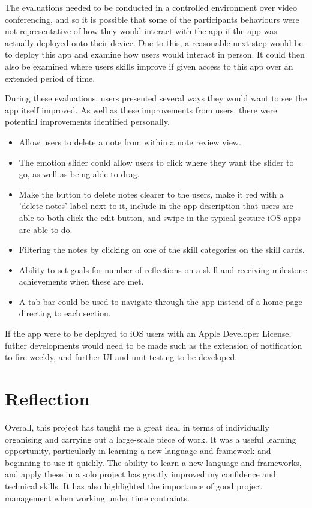 \documentclass{l4proj}
\begin{document}
The evaluations needed to be conducted in a controlled environment over video conferencing, and so it is possible that some of the participants behaviours were not representative of how they would interact with the app if the app was actually deployed onto their device. Due to this, a reasonable next step would be to deploy this app and examine how users would interact in person. It could then also be examined where users skills improve if given access to this app over an extended period of time.

During these evaluations, users presented several ways they would want to see the app itself improved. As well as these improvements from users, there were potential improvements identified personally.

\begin{itemize}
    \item Allow users to delete a note from within a note review view.
    \item The emotion slider could allow users to click where they want the slider to go, as well as being able to drag.
    \item Make the button to delete notes clearer to the users, make it red with a 'delete notes' label next to it, include in the app description that users are able to both click the edit button, and swipe in the typical gesture iOS apps are able to do.
    \item Filtering the notes by clicking on one of the skill categories on the skill cards.
    \item Ability to set goals for number of reflections on a skill and receiving milestone achievements when these are met.
    \item A tab bar could be used to navigate through the app instead of a home page directing to each section.
\end{itemize}

If the app were to be deployed to iOS users with an Apple Developer License, futher developments would need to be made such as the extension of notification to fire weekly, and further UI and unit testing to be developed. 


\section{Reflection}

Overall, this project has taught me a great deal in terms of individually organising and carrying out a large-scale piece of work. It was a useful learning opportunity, particularly in learning a new language and framework and beginning to use it quickly. The ability to learn a new language and frameworks, and apply these in a solo project has greatly improved my confidence and technical skills. It has also highlighted the importance of good project management when working under time contraints. 
\end{document}
